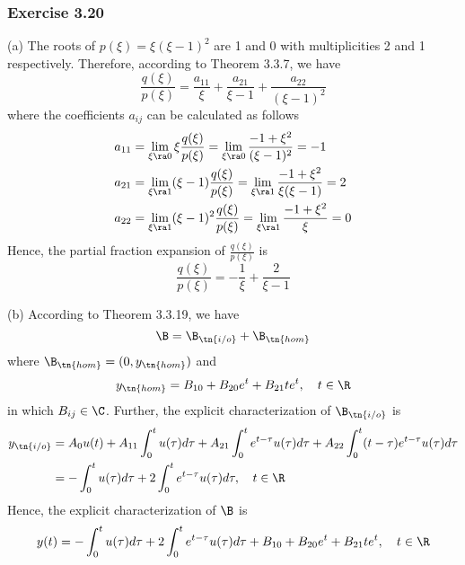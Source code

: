 \subsubsection{Exercise 3.20}
 (a) The roots of $p(\xi) = \xi(\xi-1)^2$ are 1 and 0 with multiplicities 2 and 1 respectively. Therefore, according to Theorem 3.3.7, we have 
\begin{equation}
    \frac{q(\xi)}{p(\xi)} = \frac{a_{11}}{\xi} + \frac{a_{21}}{\xi-1} + \frac{a_{22}}{(\xi-1)^2}
\end{equation}
where the coefficients $a_{ij}$ can be calculated as follows
\begin{align}
    a_{11} &= \lim_{\xi\ra 0}\xi\frac{q(\xi)}{p(\xi)} = \lim_{\xi\ra 0}\frac{-1+\xi^2}{(\xi-1)^2} = -1 \\
    a_{21} &= \lim_{\xi\ra 1}(\xi-1)\frac{q(\xi)}{p(\xi)} = \lim_{\xi\ra 1}\frac{-1+\xi^2}{\xi(\xi-1)} = 2 \\
    a_{22} &= \lim_{\xi\ra 1}(\xi-1)^2\frac{q(\xi)}{p(\xi)} = \lim_{\xi\ra 1}\frac{-1+\xi^2}{\xi} = 0
\end{align}
Hence, the partial fraction expansion of $\frac{q(\xi)}{p(\xi)}$ is
\begin{equation}
    \frac{q(\xi)}{p(\xi)} = -\frac{1}{\xi} + \frac{2}{\xi-1}
\end{equation}

(b) According to Theorem 3.3.19, we have 
\begin{equation}
    \B = \B_{\tn{i/o}} + \B_{\tn{hom}}
\end{equation}
where $\B_{\tn{hom}} = {(0,y_{\tn{hom}})}$ and 
\begin{equation}
    y_\tn{hom} = B_{10} + B_{20}e^t + B_{21}te^t, \quad t\in\R
\end{equation}
in which $B_{ij} \in \C$. Further, the explicit characterization of $\B_\tn{i/o}$ is 
\begin{equation}
    \begin{aligned}
        y_\tn{i/o} &= A_0u(t) + A_{11}\int_0^tu(\tau)d\tau + A_{21}\int_0^t e^{t-\tau}u(\tau)d\tau + A_{22}\int_0^t(t-\tau)e^{t-\tau}u(\tau)d\tau \\
        &= -\int_0^tu(\tau)d\tau + 2\int_0^te^{t-\tau}u(\tau)d\tau, \quad t\in\R
    \end{aligned}
\end{equation}
Hence, the explicit characterization of $\B$ is 
\begin{equation}
    y(t) = -\int_0^tu(\tau)d\tau + 2\int_0^te^{t-\tau}u(\tau)d\tau + B_{10} + B_{20}e^t + B_{21}te^t, \quad t\in\R
\end{equation}

